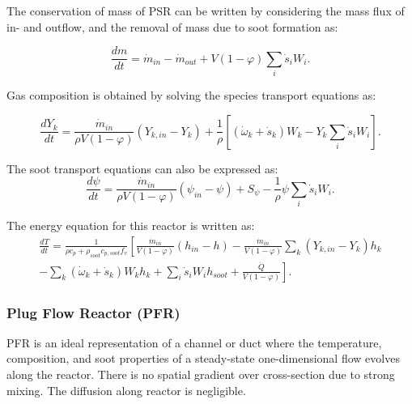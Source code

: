 The conservation of mass of PSR can be written by considering the mass flux of in- and outflow, and the removal of mass due to soot formation as:

\begin{equation}
	\frac{d m}{d t}
	=
	\dot{m}_{in} - \dot{m}_{out} 
	+ V(1 - \varphi)\sum_i \dot{s}_i W_i 
	\label{eqn:contpsr}.
\end{equation}

Gas composition is obtained by solving the species transport equations as:

\begin{equation}
	\frac{d Y_k}{d t}
	=
	\frac{{\dot{m}}_{in}}{\rho V
	\left(1-\varphi\right)}
	\left(Y_{k,in}-Y_k \right)+
	\frac{1}{\rho}\left[\left(\dot{\omega}_k+\dot{s}_k\right) W_k-Y_k \sum_i \dot{s}_i W_i\right]
	\label{eqn:speciespsr}.
\end{equation}

The soot transport equations can also be expressed as:
\begin{equation}
	\frac{d\psi}{dt}
	=
	\frac{{\dot{m}}_{in}}{\rho V
		\left(1-\varphi\right)}
	\left(\psi_{in}-\psi\right)
	+
	S_{\psi}
	-\frac{1}{\rho}\psi\sum_{i}{{\dot{s}}_i W_i}
	\label{eqn:sootpsr}.
\end{equation}

The energy equation for this reactor is written as:
\begin{equation}
	\begin{split}
		\frac{dT}{dt}
		=
		\frac{1}
		{
			\rho c_p+\rho_{soot}c_{p,soot}f_v
		}
		\left[
		\frac{{\dot{m}}_{in}}{V(1 - \varphi)}
		\left(h_{in}-h\right)
		-
		\frac{{\dot{m}}_{in}}{V (1 - \varphi)}\sum_{k}\left(Y_{k,in}-Y_k\right)h_k
		\right.\\
		\left.	
		-
		\sum_{k}{
			\left(
			{\dot{\omega}}_k
			+
			{\dot{s}}_k
			\right) W_k h_k}
		+\sum_{i}{{\dot{s}}_i W_i} h_{soot}+\frac{\dot{Q}}{V(1 - \varphi)}
		\right].
	\end{split}
		\label{eqn:energypsr}
\end{equation}



\subsubsection{Plug Flow Reactor (PFR)}
\label{sec:pfr}
PFR is an ideal representation of a channel or duct where the temperature, composition, and soot properties of a steady-state one-dimensional flow evolves   along the reactor. There is no spatial gradient over cross-section due to strong mixing. The diffusion along reactor is negligible.


